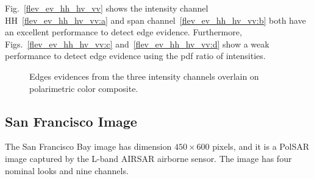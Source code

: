 \documentclass[remotesensing,article,submit,pdftex,moreauthors]{Definitions/mdpi}
\begin{document}
Fig.~\eqref{flev_ev_hh_hv_vv}  shows the intensity channel HH~\eqref{flev_ev_hh_hv_vv:a} and span channel~\eqref{flev_ev_hh_hv_vv:b} both have an excellent performance to detect edge evidence. Furthermore, Figs.~\eqref{flev_ev_hh_hv_vv:c} and~\eqref{flev_ev_hh_hv_vv:d} show a weak performance to detect edge evidence using the pdf ratio of intensities.
  \begin{figure}[hbt]
	\centering
     \caption{Edges evidences from the three intensity channels overlain on polarimetric color composite.}
     \label{flev_ev_hh_hv_vv} 
   \end{figure}
\subsection{San Francisco Image} 
The San Francisco Bay image has dimension $450\times600$ pixels, and it is a PolSAR image captured by the L-band AIRSAR airborne sensor. The image has four nominal looks and nine channels.
\end{document}
